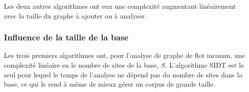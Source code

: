 Les deux autres algorithmes ont eux une complexité augmentant linéairement avec la taille du graphe à ajouter ou à analyser.

\FloatBarrier
\subsubsection{Influence de la taille de la base}
Les trois premiers algorithmes ont, pour l'analyse de graphe de flot inconnu, une complexité linéaire en le nombre de sites de la base, $S$.
L'algorithme SIDT est le seul pour lequel le temps de l'analyse ne dépend pas du nombre de sites dans la base, ce qui le rend à même de mieux gérer un corpus de grande taille.




